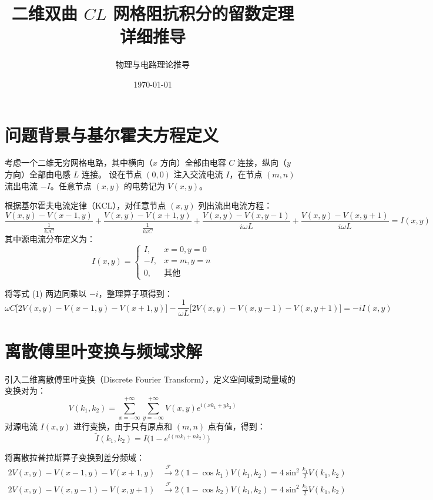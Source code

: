 \documentclass[11pt,a4paper]{ctexart}
\title{\textbf{二维双曲 $CL$ 网格阻抗积分的留数定理详细推导}}
\author{物理与电路理论推导}
\date{\today}
\begin{document}
\maketitle

\section{问题背景与基尔霍夫方程定义}
考虑一个二维无穷网格电路，其中横向（$x$ 方向）全部由电容 $C$ 连接，纵向（$y$ 方向）全部由电感 $L$ 连接。
设在节点 $(0,0)$ 注入交流电流 $I$，在节点 $(m,n)$ 流出电流 $-I$。任意节点 $(x,y)$ 的电势记为 $V(x,y)$。

根据基尔霍夫电流定律（KCL），对任意节点 $(x,y)$ 列出流出电流方程：
\begin{equation}
\frac{V(x,y) - V(x-1,y)}{\frac{1}{i\omega C}} + \frac{V(x,y) - V(x+1,y)}{\frac{1}{i\omega C}} + \frac{V(x,y) - V(x,y-1)}{i\omega L} + \frac{V(x,y) - V(x,y+1)}{i\omega L} = I(x,y)
\end{equation}
其中源电流分布定义为：
\begin{equation}
I(x,y) = \begin{cases} 
I, & x=0, y=0 \\
-I, & x=m, y=n \\
0, & \text{其他}
\end{cases}
\end{equation}

将等式 (1) 两边同乘以 $-i$，整理算子项得到：
\begin{equation}
\omega C \big[ 2V(x,y) - V(x-1,y) - V(x+1,y) \big] - \frac{1}{\omega L} \big[ 2V(x,y) - V(x,y-1) - V(x,y+1) \big] = -i I(x,y)
\end{equation}

\section{离散傅里叶变换与频域求解}
引入二维离散傅里叶变换（Discrete Fourier Transform），定义空间域到动量域的变换对为：
\begin{equation}
V(k_1, k_2) = \sum_{x=-\infty}^{+\infty} \sum_{y=-\infty}^{+\infty} V(x,y) e^{i(x k_1 + y k_2)}
\end{equation}
对源电流 $I(x,y)$ 进行变换，由于只有原点和 $(m,n)$ 点有值，得到：
\begin{equation}
\tilde{I}(k_1, k_2) = I \big( 1 - e^{i(m k_1 + n k_2)} \big)
\end{equation}

将离散拉普拉斯算子变换到差分频域：
\begin{align}
2V(x,y) - V(x-1,y) - V(x+1,y) &\xrightarrow{\mathcal{F}} 2(1 - \cos k_1) V(k_1, k_2) = 4\sin^2\frac{k_1}{2} V(k_1, k_2) \\
2V(x,y) - V(x,y-1) - V(x,y+1) &\xrightarrow{\mathcal{F}} 2(1 - \cos k_2) V(k_1, k_2) = 4\sin^2\frac{k_2}{2} V(k_1, k_2)
\end{align}
\end{document}
